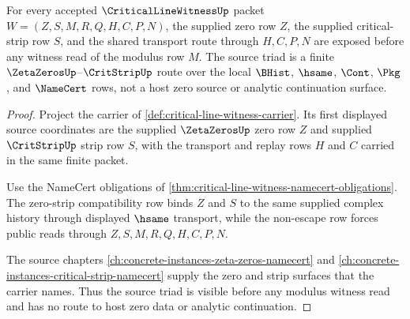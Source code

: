 \begin{theorem}
\label{thm:critical-line-witness-root-unblock-source-triad}
For every accepted $\CriticalLineWitnessUp$ packet $W=(Z,S,M,R,Q,H,C,P,N)$, the supplied zero row $Z$, the supplied critical-strip row $S$, and the shared transport route through $H,C,P,N$ are exposed before any witness read of the modulus row $M$. The source triad is a finite $\ZetaZerosUp$--$\CritStripUp$ route over the local $\BHist$, $\hsame$, $\Cont$, $\Pkg$, and $\NameCert$ rows, not a host zero source or analytic continuation surface.
\end{theorem}
\begin{proof}
Project the carrier of \autoref{def:critical-line-witness-carrier}. Its first displayed source coordinates are the supplied $\ZetaZerosUp$ zero row $Z$ and supplied $\CritStripUp$ strip row $S$, with the transport and replay rows $H$ and $C$ carried in the same finite packet.

Use the NameCert obligations of \autoref{thm:critical-line-witness-namecert-obligations}. The zero-strip compatibility row binds $Z$ and $S$ to the same supplied complex history through displayed $\hsame$ transport, while the non-escape row forces public reads through $Z,S,M,R,Q,H,C,P,N$.

The source chapters \autoref{ch:concrete-instances-zeta-zeros-namecert} and \autoref{ch:concrete-instances-critical-strip-namecert} supply the zero and strip surfaces that the carrier names. Thus the source triad is visible before any modulus witness read and has no route to host zero data or analytic continuation.
\end{proof}

